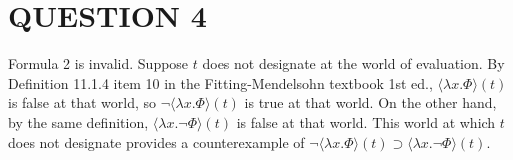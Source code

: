 \section*{QUESTION 4}
Formula 2 is invalid. Suppose $t$ does not designate at the world of evaluation. By Definition 11.1.4 item 10 in the Fitting-Mendelsohn textbook 1st ed., $\langle \lambda x. \Phi \rangle(t)$ is false at that world, so $\neg \langle \lambda x. \Phi \rangle(t)$ is true at that world. On the other hand, by the same definition, $\langle \lambda x. \neg \Phi \rangle(t)$ is false at that world. This world at which $t$ does not designate provides a counterexample of $\neg \langle \lambda x. \Phi \rangle(t) \supset \langle \lambda x. \neg \Phi \rangle(t)$.

